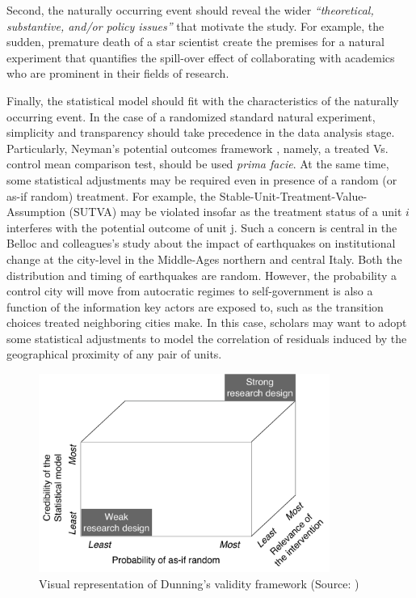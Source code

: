 \documentclass[nobib]{tufte-handout}
\begin{document}
\begin{refsection}
Second, the naturally occurring event should reveal the wider
\emph{``theoretical, substantive, and/or policy issues''} \parencite[][page
29]{Dunning2012} that motivate the study. For example, the sudden, premature
death of a star scientist \parencite[][]{Azoulay2010} create the premises for a
natural experiment that quantifies the spill-over effect of collaborating with
academics who are prominent in their fields of research.

Finally, the statistical model should fit with the characteristics of the
naturally occurring event. In the case of a randomized standard natural
experiment, simplicity and transparency should take precedence in the data
analysis stage. Particularly, Neyman's potential outcomes framework
\parencite[][]{Splawa1990}, namely, a treated Vs. control mean comparison test,
should be used \emph{prima facie}. At the same time, some statistical
adjustments may be required even in presence of a random (or as-if random)
treatment. For example, the Stable-Unit-Treatment-Value-Assumption (SUTVA) may
be violated insofar as the treatment status of a unit $i$ interferes with the
potential outcome of unit j. Such a concern is central in the Belloc and
colleagues's \parencite*[][]{Belloc2016} study about the impact of earthquakes
on institutional change at the city-level in the Middle-Ages northern and
central Italy. Both the distribution and timing of earthquakes are random.
However, the probability a control city will move from autocratic regimes to
self-government is also a function of the information key actors are exposed to,
such as the transition choices treated neighboring cities make. In this case,
scholars may want to adopt some statistical adjustments to model the correlation
of residuals induced by the geographical proximity of any pair of units.

\begin{figure}[]
    \centering
    \includegraphics[width=0.85\textwidth]{exhibits/validity_framework.pdf}
    \caption{Visual representation of Dunning's validity framework (Source:
    \parencite[][page 31]{Dunning2012})}
    \label{fig:validity_framework}
\end{figure}


\end{refsection}
\end{document}
